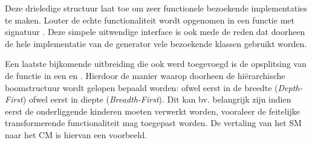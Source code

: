 Deze drieledige structuur laat toe om zeer functionele bezoekende
implementaties te maken. Louter de echte functionaliteit wordt opgenomen in een
functie met signatuur . Deze simpele uitwendige interface
is ook mede de reden dat doorheen de hele implementatie van de generator vele
bezoekende klassen gebruikt worden.

Een laatste bijkomende uitbreiding die ook werd toegevoegd is de opsplitsing
van de  functie in een  en
. Hierdoor de manier waarop doorheen de
hi\"erarchische boomstructuur wordt gelopen bepaald worden: ofwel eerst in de
breedte (\emph{Depth-First}) ofwel eerst in diepte (\emph{Breadth-First}). Dit
kan bv. belangrijk zijn indien eerst de onderliggende kinderen moeten verwerkt
worden, vooraleer de feitelijke transformerende functionaliteit mag toegepast
worden. De vertaling van het SM naar het CM is hiervan een voorbeeld.
